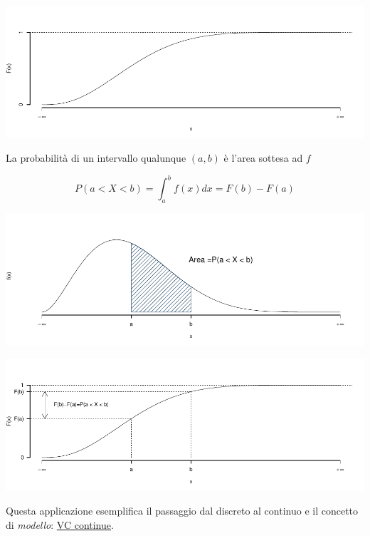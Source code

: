 \documentclass[
  11pt,
]{book}
\theoremstyle{mytheoremstyle}
\theoremstyle{mydefstyle}
\begin{document}
\begin{center}\includegraphics{Appunti_di_Statistica_2025_files/figure-latex/06-Variabili-Casuali-13-1} \end{center}

La probabilità di un intervallo qualunque \((a,b)\) è l'area sottesa ad \(f\)

\[P(a<X<b)=\int_{a}^{b}f(x)dx=F(b)-F(a)\]

\begin{center}\includegraphics{Appunti_di_Statistica_2025_files/figure-latex/06-Variabili-Casuali-14-1} \end{center}

\begin{center}\includegraphics{Appunti_di_Statistica_2025_files/figure-latex/06-Variabili-Casuali-14-2} \end{center}

Questa applicazione esemplifica il passaggio dal discreto al continuo e il concetto di \emph{modello}:
\href{https://patrizio-frederic.shinyapps.io/discreto-continuo/}{VC continue}.
\end{document}
